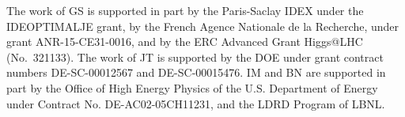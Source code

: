 \documentclass[11pt,letterpaper]{article}
\begin{document}
\begin{acknowledgments}

The work of GS is supported in part by the Paris-Saclay IDEX under the
IDEOPTIMALJE grant, by the French Agence Nationale de la Recherche,
under grant ANR-15-CE31-0016, and by the ERC Advanced Grant Higgs@LHC
(No.\ 321133).
%
The work of JT is supported by the DOE under grant contract numbers DE-SC-00012567 and DE-SC-00015476.
%
IM and BN are supported in part by the Office of High Energy Physics of the U.S. Department of Energy under Contract No. DE-AC02-05CH11231, and the LDRD Program of LBNL.

\end{acknowledgments}



\end{document}
